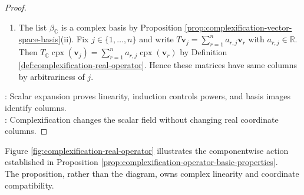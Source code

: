 \begin{proposition}
\begin{proof}
\begin{enumerate}[label=(\roman*)]
Thus $(\forall\,k\in\mathbb{Z}_{\geq0})\,(T_{\mathbb{C}})^k(\mathbf{u}+i\mathbf{v})=T^k\mathbf{u}+iT^k\mathbf{v}$ by induction, and claim (ii) follows by the arbitrariness of $\mathbf{u},\mathbf{v}$.
\item The list $\beta_{\mathbb{C}}$ is a complex basis by Proposition \ref{prop:complexification-vector-space-basis}(ii). Fix $j\in\{1,\ldots,n\}$ and write $T\mathbf{v}_j=\sum\limits_{r=1}^{n}a_{r,j}\mathbf{v}_r$ with $a_{r,j}\in\mathbb{R}$.\\
Then $T_{\mathbb{C}}\operatorname{cpx}(\mathbf{v}_j)=\sum\limits_{r=1}^{n}a_{r,j}\operatorname{cpx}(\mathbf{v}_r)$ by Definition \ref{def:complexification-real-operator}. Hence these matrices have same columns by arbitrariness of $j$.
\end{enumerate}
: Scalar expansion proves linearity, induction controls powers, and basis images identify columns.\\
: Complexification changes the scalar field without changing real coordinate columns.
\end{proof}
\end{proposition}

Figure \ref{fig:complexification-real-operator} illustrates the componentwise action established in Proposition \ref{prop:complexification-operator-basic-properties}.\\
The proposition, rather than the diagram, owns complex linearity and coordinate compatibility.

\begin{illustrationfigure}[H]
  \centering
  
  \caption{Complexification packages two real vectors: $T_{\mathbb{C}}(\mathbf{u}+i\mathbf{v})=T\mathbf{u}+iT\mathbf{v}$.}
  \label{fig:complexification-real-operator}
\end{illustrationfigure}

